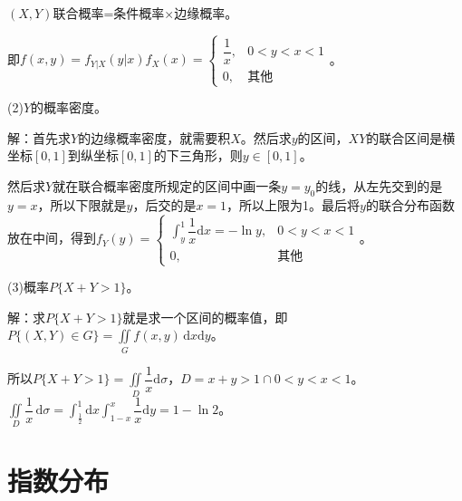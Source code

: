 \documentclass[UTF8, 12pt]{ctexart}
\begin{document}
$(X,Y)$联合概率=条件概率×边缘概率。

即$f(x,y)=f_{Y|X}(y|x)f_X(x)=\left\{\begin{array}{ll}
    \dfrac{1}{x}, & 0<y<x<1 \\
    0, & \text{其他}
\end{array}\right.$。

(2)$Y$的概率密度。

解：首先求$Y$的边缘概率密度，就需要积$X$。然后求$y$的区间，$XY$的联合区间是横坐标$[0,1]$到纵坐标$[0,1]$的下三角形，则$y\in[0,1]$。

然后求$Y$就在联合概率密度所规定的区间中画一条$y=y_0$的线，从左先交到的是$y=x$，所以下限就是$y$，后交的是$x=1$，所以上限为1。最后将$y$的联合分布函数放在中间，得到$f_Y(y)=\left\{\begin{array}{ll}
    \displaystyle{\int_y^1\dfrac{1}{x}\textrm{d}x}=-\ln y, & 0<y<x<1 \\
    0, & \text{其他}
\end{array}\right.$。

(3)概率$P\{X+Y>1\}$。

解：求$P\{X+Y>1\}$就是求一个区间的概率值，即$P\{(X,Y)\in G\}=\iint\limits_Gf(x,y)\,\textrm{d}x\textrm{d}y$。

\begin{multicols}{2}
    

    所以$P\{X+Y>1\}=\iint\limits_D\dfrac{1}{x}\textrm{d}\sigma$，$D=x+y>1\cap0<y<x<1$。$\iint\limits_D\dfrac{1}{x}\,\textrm{d}\sigma=\int_\frac{1}{2}^1\textrm{d}x\int_{1-x}^x\dfrac{1}{x}\textrm{d}y=1-\ln2$。

\end{multicols}

\section{指数分布}
\end{document}
